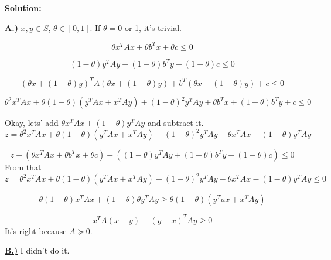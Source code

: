 \underline{\textbf{Solution:}}

\underline{\textbf{A.)}}
$x, y \in S$, $\theta \in [0, 1]$. If $\theta = 0$ or 1, it's trivial.

\begin{equation*}
    \theta x^TAx + \theta b^Tx + \theta c \leq 0
\end{equation*}

\begin{equation*}
    (1-\theta) y^TAy + (1-\theta) b^Ty + (1-\theta) c \leq 0
\end{equation*}

\begin{equation*}
    (\theta x + (1-\theta)y)^TA(\theta x + (1-\theta)y) + b^T(\theta x + (1-\theta)y) + c \leq 0
\end{equation*}

\begin{equation*}
    \theta^2 x^TAx + \theta(1-\theta)\left(y^TAx + x^TAy \right) + (1-\theta)^2 y^TAy + \theta b^Tx + (1-\theta)b^Ty + c \leq 0
\end{equation*}

Okay, lets' add $\theta x^TAx + (1-\theta)y^TAy$ and subtract it. 
\newline
$z = \theta^2 x^TAx + \theta(1-\theta)\left(y^TAx + x^TAy \right) + (1-\theta)^2 y^TAy - \theta x^TAx - (1-\theta)y^TAy $

\begin{equation*}
    z + \left(\theta x^TAx + \theta b^Tx + \theta c \right) + \left((1-\theta)y^TAy + (1-\theta)b^Ty + (1-\theta)c \right) \leq 0
\end{equation*}
From that
\begin{equation*}
    z = \theta^2 x^TAx + \theta(1-\theta)\left(y^TAx + x^TAy \right) + (1-\theta)^2 y^TAy - \theta x^TAx - (1-\theta)y^TAy  \leq 0
\end{equation*}

\begin{equation*}
    \theta(1-\theta) x^TAx + (1-\theta)\theta y^TAy \geq \theta(1-\theta)(y^Tax + x^TAy)
\end{equation*}

\begin{equation*}
    x^TA(x-y) + (y-x)^TAy \geq 0
\end{equation*}
It's right because $A \succcurlyeq 0$. 

\underline{\textbf{B.)}} I didn't do it.









